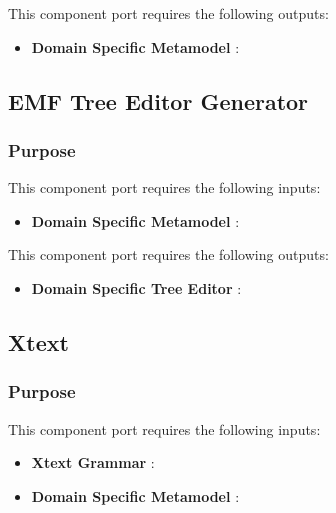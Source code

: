 \documentclass{gemoc} %
\begin{document}
This component port requires the following outputs:
\begin{itemize}
  \item \textbf{Domain Specific Metamodel} :
\end{itemize}

\subsection{EMF Tree Editor Generator}


\subsubsection{Purpose}

This component port requires the following inputs:
\begin{itemize}
  \item \textbf{Domain Specific Metamodel} :
\end{itemize}

This component port requires the following outputs:
\begin{itemize}
  \item \textbf{Domain Specific Tree Editor} :
\end{itemize}

\subsection{Xtext}


\subsubsection{Purpose}

This component port requires the following inputs:
\begin{itemize}
  \item \textbf{Xtext Grammar} :
  \item \textbf{Domain Specific Metamodel} :
\end{itemize}
\end{document}
